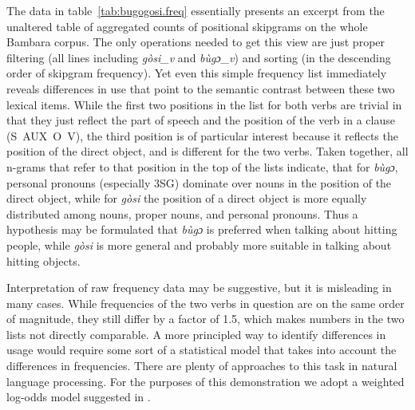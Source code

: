 \documentclass[12pt]{article}
\begin{document}
The data in table~\ref{tab:bugogosi.freq} essentially presents an
excerpt from the unaltered table of aggregated counts of positional
skipgrams on the whole Bambara corpus. The only operations needed to
get this view are just proper filtering (all lines including
\textit{gòsi\_v} and \textit{bùgɔ\_v}) and sorting (in the descending
order of skipgram frequency). Yet even this simple frequency list
immediately reveals differences in use that point to the semantic
contrast between these two lexical items. While the first two
positions in the list for both verbs are trivial in that they just
reflect the part of speech and the position of the verb in a clause
(\mbox{S AUX O V}), the third position is of particular interest
because it reflects the position of the direct object, and is different
for the two verbs. Taken together, all n-grams that refer to that
position in the top of the lists indicate, that for \textit{bùgɔ},
personal pronouns (especially 3SG) dominate over nouns in the position
of the direct object, while for \textit{gòsi} the position of a direct
object is more equally distributed among nouns, proper nouns, and
personal pronouns. Thus a hypothesis may be formulated that
\textit{bùgɔ} is preferred when talking about hitting people, while
\textit{gòsi} is more general and probably more suitable in talking
about hitting objects.

Interpretation of raw frequency data may be suggestive, but it is
misleading in many cases. While frequencies of the two verbs in
question are on the same order of magnitude, they still differ by a
factor of 1.5, which makes numbers in the two lists not directly
comparable. A more principled way to identify differences in usage
would require some sort of a statistical model that takes into account
the differences in frequencies. There are plenty of approaches to this
task in natural language processing. For the purposes of this
demonstration we adopt a weighted log-odds model suggested in
\textcite{monroe2008}.
\end{document}
